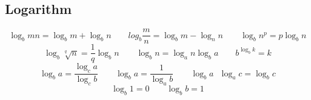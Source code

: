 \subsection{Logarithm}

$$ \log _{b} mn = \log _{b} m + \log _{b} n \quad\quad log _{b} \dfrac{m}{n} = \log _{b} m - \log _{n} n \quad\quad \log _{b} n^p = p \log _{b} n$$
$$ \log _{b} \sqrt[q]{n} = \dfrac{1}{q} \log _{b} n \quad\quad \log _{b} n = \log _{a} n \log _{b} a \quad\quad b^{\log _{b} k} = k $$
$$ \log _{b} a = \dfrac{\log _{c} a}{\log _{c} b} \quad\quad \log _{b} a = \dfrac{1}{\log _{a} b} \quad\quad \log _{b} a \text{ } \log _{a} c = \log _{b} c $$
$$ \log _{b} 1 = 0 \quad\quad \log _{b} b = 1 $$
